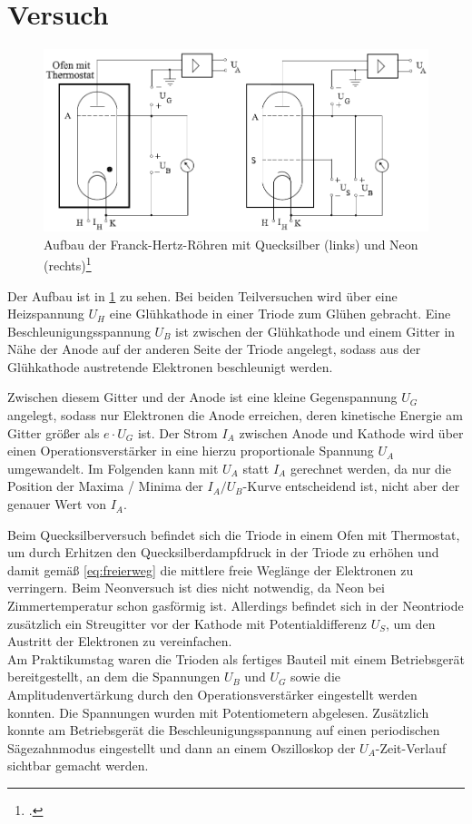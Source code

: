 \section{Versuch}
\begin{figure}[!htb]
  \centering
  \includegraphics[width=.8\textwidth]{res/aufbau}
  \caption{Aufbau der Franck-Hertz-Röhren mit Quecksilber (links) und Neon (rechts)\footcite{anleitung-ss2015}}
  \label{fig:aufbau}
\end{figure}
Der Aufbau ist in \cref{fig:aufbau} zu sehen. Bei beiden Teilversuchen wird über eine Heizspannung $U_H$ eine Glühkathode in einer Triode zum Glühen gebracht. Eine Beschleunigungsspannung $U_B$ ist zwischen der Glühkathode und einem Gitter in Nähe der Anode auf der anderen Seite der Triode angelegt, sodass aus der Glühkathode austretende Elektronen beschleunigt werden. 

Zwischen diesem Gitter und der Anode ist eine kleine Gegenspannung $U_G$ angelegt, sodass nur Elektronen die Anode erreichen, deren kinetische Energie am Gitter größer als $e\cdot U_G$ ist. 
Der Strom $I_A$ zwischen Anode und Kathode wird über einen Operationsverstärker in eine hierzu proportionale Spannung $U_A$ umgewandelt. Im Folgenden kann mit $U_A$ statt $I_A$ gerechnet werden, da nur die Position der Maxima / Minima der $I_A/U_B$-Kurve entscheidend ist, nicht aber der genauer Wert von $I_A$.

Beim Quecksilberversuch befindet sich die Triode in einem Ofen mit Thermostat, um durch Erhitzen den Quecksilberdampfdruck in der Triode zu erhöhen und damit gemäß \cref{eq:freierweg} die mittlere freie Weglänge der Elektronen zu verringern. Beim Neonversuch ist dies nicht notwendig, da Neon bei Zimmertemperatur schon gasförmig ist. Allerdings befindet sich in der Neontriode zusätzlich ein Streugitter vor der Kathode mit Potentialdifferenz $U_S$, um den Austritt der Elektronen zu vereinfachen.\\

Am Praktikumstag waren die Trioden als fertiges Bauteil mit einem Betriebsgerät bereitgestellt, an dem die Spannungen $U_B$ und $U_G$ sowie die Amplitudenvertärkung durch den Operationsverstärker eingestellt werden konnten. Die Spannungen wurden mit Potentiometern abgelesen.  Zusätzlich konnte am Betriebsgerät die Beschleunigungsspannung auf einen periodischen Sägezahnmodus eingestellt und dann an einem Oszilloskop der $U_A$-Zeit-Verlauf sichtbar gemacht werden.\\


